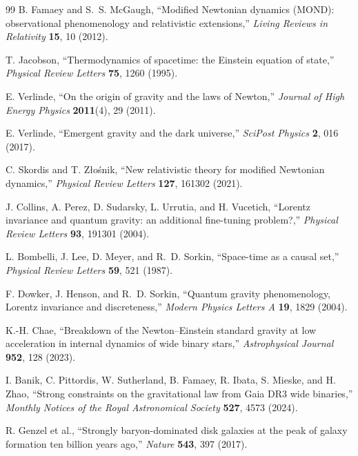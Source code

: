 \documentclass[11pt]{article}
\begin{document}
\begin{thebibliography}{99}
B. Famaey and S.~S. McGaugh,
``Modified Newtonian dynamics (MOND): observational phenomenology and relativistic extensions,''
\emph{Living Reviews in Relativity} \textbf{15}, 10 (2012).

T. Jacobson,
``Thermodynamics of spacetime: the Einstein equation of state,''
\emph{Physical Review Letters} \textbf{75}, 1260 (1995).

E. Verlinde,
``On the origin of gravity and the laws of Newton,''
\emph{Journal of High Energy Physics} \textbf{2011}(4), 29 (2011).

E. Verlinde,
``Emergent gravity and the dark universe,''
\emph{SciPost Physics} \textbf{2}, 016 (2017).

C. Skordis and T. Z\l{}o\'snik,
``New relativistic theory for modified Newtonian dynamics,''
\emph{Physical Review Letters} \textbf{127}, 161302 (2021).

J. Collins, A. Perez, D. Sudarsky, L. Urrutia, and H. Vucetich,
``Lorentz invariance and quantum gravity: an additional fine-tuning problem?,''
\emph{Physical Review Letters} \textbf{93}, 191301 (2004).

L. Bombelli, J. Lee, D. Meyer, and R.~D. Sorkin,
``Space-time as a causal set,''
\emph{Physical Review Letters} \textbf{59}, 521 (1987).

F. Dowker, J. Henson, and R.~D. Sorkin,
``Quantum gravity phenomenology, Lorentz invariance and discreteness,''
\emph{Modern Physics Letters A} \textbf{19}, 1829 (2004).

K.-H. Chae,
``Breakdown of the Newton--Einstein standard gravity at low acceleration in internal dynamics of wide binary stars,''
\emph{Astrophysical Journal} \textbf{952}, 128 (2023).

I. Banik, C. Pittordis, W. Sutherland, B. Famaey, R. Ibata, S. Mieske, and H. Zhao,
``Strong constraints on the gravitational law from Gaia DR3 wide binaries,''
\emph{Monthly Notices of the Royal Astronomical Society} \textbf{527}, 4573 (2024).

R. Genzel et al.,
``Strongly baryon-dominated disk galaxies at the peak of galaxy formation ten billion years ago,''
\emph{Nature} \textbf{543}, 397 (2017).


\end{thebibliography}
\end{document}
